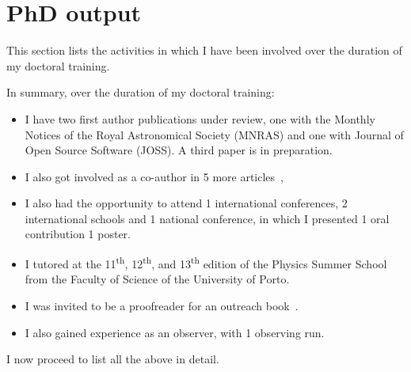 \chapter{PhD output}\label{app:phd_output}

This section lists the activities in which I have been involved over the duration of my doctoral training.

In summary, over the duration of my doctoral training:
\begin{itemize}
    \item I have two first author publications under review, one with the Monthly Notices of the Royal Astronomical Society (MNRAS) and one with Journal of Open Source Software (JOSS). A third paper is in preparation. 
    \item I also got involved as a co-author in 5 more articles~\citep{figueira_radial_2016, barros_precise_2017, santerne_earthsized_2018, lillo-box_troy_2018, ulmer-moll_telluric_2018},
    \item I also had the opportunity to attend 1 international conferences, 2 international schools and 1 national conference, in which I presented 1 oral contribution 1 poster.
    \item I tutored at the 11\textsuperscript{th}, 12\textsuperscript{th}, and 13\textsuperscript{th} edition of the Physics Summer School from the Faculty of Science of the University of Porto.
    \item I was invited to be a proofreader for an outreach book~\citet{figueira_astro_2015}.
    \item I also gained experience as an observer, with 1 observing run.
\end{itemize}

I now proceed to list all the above in detail.

\clearpage


\clearpage


\clearpage


\clearpage


\clearpage


\clearpage


\clearpage
